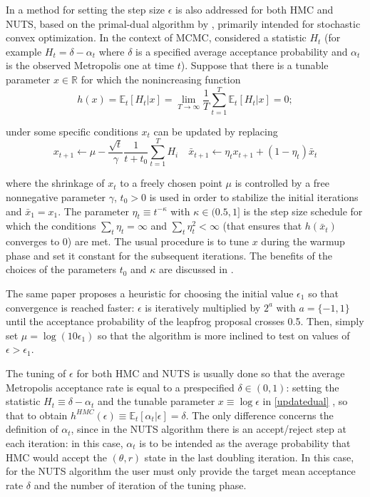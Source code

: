 \documentclass{article}
\begin{document}
In \citet{hoffman2014nuts} a method for setting the step size $\epsilon$ is also addressed for both HMC and NUTS, based on the primal-dual algorithm by \citet{nesterov2009dual}, primarily intended for stochastic convex optimization. In the context of MCMC, considered a statistic $H_t$  (for example $H_t=\delta-\alpha_t$ where $\delta$ is a specified average acceptance probability and $\alpha_t$ is the observed Metropolis one at time $t$). Suppose that there is a tunable parameter $x \in \mathbb{R}$ for which the nonincreasing function
\begin{equation*}
h(x)=\mathbb{E}_t[H_t|x]=\lim_{T \rightarrow \infty}\frac{1}{T}\sum_{t=1}^{T}\mathbb{E}_t[H_t|x] = 0;
\end{equation*}

under some specific conditions $x_t$ can be updated by replacing
\begin{equation}
x_{t+1}\leftarrow \mu - \frac{\sqrt{t}}{\gamma}\frac{1}{t+t_0}\sum_{t=1}^{T}H_i \quad \bar{x}_{t+1} \leftarrow \eta_t x_{t+1}+(1-\eta_t)\bar{x}_{t}
\label{updatedual}
\end{equation}

where the shrinkage of $x_t$ to a freely chosen point $\mu$ is controlled by a free nonnegative parameter $\gamma$, $t_0>0$ is used in order to stabilize the initial iterations and $\bar{x}_1=x_1$. The parameter $\eta_t \equiv t^{-\kappa}$ with $\kappa \in (0.5,1]$ is the step size schedule for which the conditions $\sum_t \eta_t=\infty$ and $\sum_t \eta^2_t < \infty$ (that ensures that $h(\bar{x}_t)$ converges to 0) are met. The usual procedure is to tune $x$ during the warmup phase and set it constant for the subsequent iterations. The benefits of the choices of the parameters $t_0$ and $\kappa$ are discussed in
\citet{hoffman2014nuts}.

\par The same paper proposes a heuristic for choosing the initial value $\epsilon_1$ so that convergence is reached faster: $\epsilon$ is iteratively multiplied by $2^a$ with $a = \{-1,1\}$ until the acceptance probability of the leapfrog proposal crosses 0.5. Then, simply set $\mu=\log(10\epsilon_1)$ so that the algorithm is more inclined to test on values of $\epsilon>\epsilon_1$.
\par The tuning of $\epsilon$ for both HMC and NUTS is usually done so that the average Metropolis acceptance rate is equal to a prespecified $\delta \in (0,1)$: setting the statistic $H_t \equiv \delta - \alpha_t$ and the tunable parameter $x\equiv \log{\epsilon}$ in \eqref{updatedual}
, so that to obtain $h^{HMC}(\epsilon)\equiv \mathbb{E}_t[\alpha_t|\epsilon]=\delta$.
The only difference concerns the definition of $\alpha_t$, since in the NUTS algorithm there is an accept/reject step at each iteration: in this case, $\alpha_t$ is to be intended as the average probability that HMC would accept  the $(\theta,r)$ state in the last doubling iteration. In this case, for the NUTS algorithm the user must only provide the target mean acceptance rate $\delta$ and the number of iteration of the tuning phase.
\end{document}
